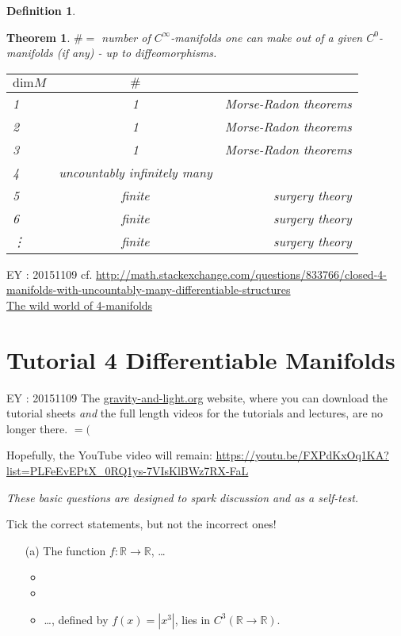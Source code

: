 \documentclass[10pt]{amsart}
\newtheorem{theorem}{Theorem}
\newtheorem{definition}{Definition}
\newcommand{\exercisehead}[1]
  { \smallskip
   \noindent{\small\bf Exercise #1.}
  }
\begin{document}
\begin{multicols*}{2}
\begin{definition}
	
	\end{definition}
	
	\begin{theorem}
	$\# = $ number of $C^{\infty}$-manifolds one can make out of a given $C^0$-manifolds (if any) - up to diffeomorphisms.  
	
	\begin{tabular}{l | c r }
	$\text{dim}M$ &  $\#$ &  \\
	\hline
	1  & 1  & Morse-Radon theorems \\
	2  & 1  & Morse-Radon theorems \\
	3 & 1  & Morse-Radon theorems \\
	4 & uncountably infinitely many & \\
	5 &   finite  & surgery theory \\
	6 &  finite & surgery theory \\
	\vdots & finite & surgery theory
	\end{tabular}
	
	\end{theorem}
	
	EY : 20151109 cf. \url{http://math.stackexchange.com/questions/833766/closed-4-manifolds-with-uncountably-many-differentiable-structures}  \\
	\href{http://www.maths.ed.ac.uk/~aar/papers/scorpan.pdf}{The wild world of 4-manifolds}
	
	
	\section*{Tutorial 4 Differentiable Manifolds}
	
	EY : 20151109 The \url{gravity-and-light.org} website, where you can download the tutorial sheets \emph{and} the full length videos for the tutorials and lectures, are no longer there.  $=($  
	
	Hopefully, the YouTube video will remain: \url{https://youtu.be/FXPdKxOq1KA?list=PLFeEvEPtX_0RQ1ys-7VIsKlBWz7RX-FaL}
	
	\exercisehead{1: True or false?} \emph{These basic questions are designed to spark discussion and as a self-test.}
	
	Tick the correct statements, but not the incorrect ones!
	
	\begin{enumerate}
	\item[(a)] The function $f: \mathbb{R} \to \mathbb{R}$, \dots
	\begin{itemize}
	\item  
	\item
	\item \dots , defined by $f(x) = |x^3|$, lies in $C^3(\mathbb{R} \to \mathbb{R})$.  
	

\end{itemize}
\end{enumerate}
\end{multicols*}
\end{document}

